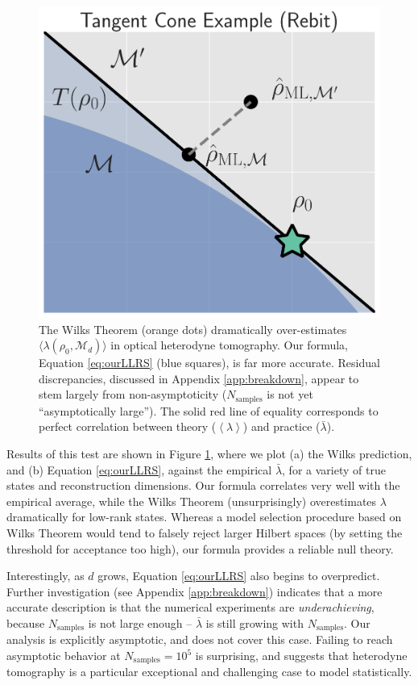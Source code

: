 \documentclass[aps,pra, twocolumn]{revtex4}
\newcommand{\M}{\mathcal{M}}
\newcommand{\expect}[1]{\ensuremath{\left\langle#1\right\rangle}}
\begin{document}
\begin{figure}[h]
 \includegraphics[width=\columnwidth]{Images/Figure_4.pdf}
 \caption{The Wilks Theorem (orange dots) dramatically over-estimates $\langle\lambda(\rho_{0}, \M_{d})\rangle$ in optical heterodyne tomography. Our formula, Equation \ref{eq:ourLLRS} (blue squares), is far more accurate. Residual discrepancies, discussed in Appendix \ref{app:breakdown}, appear to stem largely from non-asymptoticity ($N_{\mathrm{samples}}$ is not yet ``asymptotically large''). The solid red line of equality corresponds to perfect correlation between theory ($\expect{\lambda}$) and practice ($\bar\lambda$).}
 \label{fig:modelcomp}
\end{figure}

Results of this test are shown in Figure \ref{fig:modelcomp}, where we plot (a) the Wilks prediction, and (b) Equation \eqref{eq:ourLLRS}, against the empirical $\bar\lambda$, for a variety of true states and reconstruction dimensions.  Our formula correlates very well with the empirical average, while the Wilks Theorem (unsurprisingly) overestimates $\lambda$ dramatically for low-rank states.  Whereas a model selection procedure based on Wilks Theorem would tend to falsely reject larger Hilbert spaces (by setting the threshold for acceptance too high), our formula provides a reliable null theory.

Interestingly, as $d$ grows, Equation \eqref{eq:ourLLRS} also begins to overpredict.  Further investigation (see Appendix \ref{app:breakdown}) indicates that a more accurate description is that the numerical experiments are \emph{underachieving}, because $N_{\mathrm{samples}}$ is not large enough -- $\bar\lambda$ is still growing with $N_{\mathrm{samples}}$.  Our analysis is explicitly asymptotic, and does not cover this case.  Failing to reach asymptotic behavior at $N_{\mathrm{samples}}=10^5$ is surprising, and suggests that heterodyne tomography is a particular exceptional and challenging case to model statistically.
\end{document}
